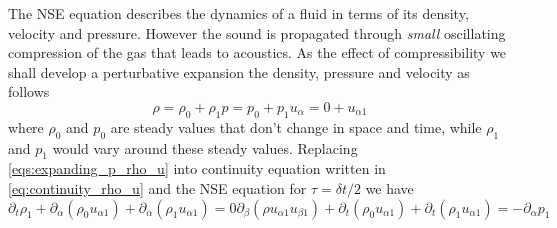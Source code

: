 The NSE equation describes the dynamics of a fluid in terms of its density, velocity and pressure. However the sound is propagated through \textit{small} oscillating compression of the gas that leads to acoustics. As the effect of compressibility we shall develop a perturbative expansion the density, pressure and velocity as follows
\begin{subequations}\label{eqs:expanding_p_rho_u}
\begin{equation}\label{eq:expand_rho}
    \rho = \rho_0 + \rho_1
\end{equation}
\begin{equation}\label{eq:expand_p}
    p = p_0 + p_1
\end{equation}
\begin{equation}\label{eq:expand_u}
    u_\alpha = 0 + u_{\alpha1}
\end{equation}
\end{subequations}
where $\rho_0$ and $p_0$ are steady values that don't change in space and time, while $\rho_1$ and $p_1$ would vary around these steady values. Replacing \ref{eqs:expanding_p_rho_u} into continuity equation written in \ref{eq:continuity_rho_u} and the NSE equation for $\tau=\delta t/2$ we have
\begin{subequations}\label{eqs:cont_euler_waves_nonlinear}
\begin{equation}\label{eq:continuity_nonlinear}
    \partial_t\rho_1 + \partial_\alpha(\rho_0 u_{\alpha1}) + \partial_\alpha(\rho_1 u_{\alpha1}) = 0
\end{equation}
\begin{equation}\label{eq:euler_nonlinear}
    \partial_\beta(\rho u_{\alpha1}u_{\beta1}) + \partial_t(\rho_0 u_{\alpha1}) + \partial_t(\rho_1u_{\alpha1}) = -\partial_\alpha p_1 
\end{equation}
\end{subequations}

